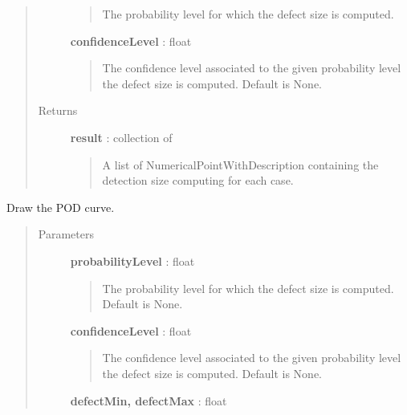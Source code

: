 \documentclass[letterpaper,10pt,english]{sphinxmanual}
\begin{document}
\begin{fulllineitems}
\begin{fulllineitems}
\begin{quote}
\begin{description}
\begin{quote}
The probability level for which the defect size is computed.
\end{quote}

\textbf{confidenceLevel} : float
\begin{quote}

The confidence level associated to the given probability level the
defect size is computed. Default is None.
\end{quote}

\item[{Returns}] \leavevmode
\textbf{result} : collection of \href{http://doc.openturns.org/openturns-latest/sphinx/user\_manual/\_generated/openturns.NumericalPointWithDescription.html\#openturns.NumericalPointWithDescription}{}
\begin{quote}

A list of NumericalPointWithDescription containing the detection size
computing for each case.
\end{quote}

\end{description}\end{quote}

\end{fulllineitems}


\begin{fulllineitems}
\label{_generated/otpod.UnivariateLinearModelPOD:otpod.UnivariateLinearModelPOD.drawPOD}
Draw the POD curve.
\begin{quote}\begin{description}
\item[{Parameters}] \leavevmode
\textbf{probabilityLevel} : float
\begin{quote}

The probability level for which the defect size is computed. Default
is None.
\end{quote}

\textbf{confidenceLevel} : float
\begin{quote}

The confidence level associated to the given probability level the
defect size is computed. Default is None.
\end{quote}

\textbf{defectMin, defectMax} : float
\begin{quote}


\end{quote}
\end{description}
\end{quote}
\end{fulllineitems}
\end{fulllineitems}
\end{document}
